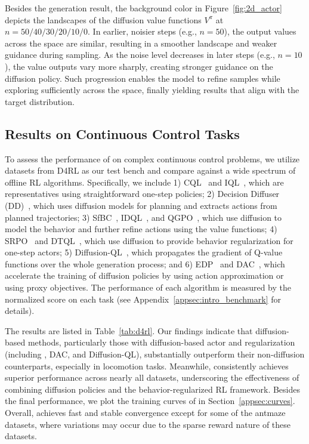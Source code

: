 Besides the generation result, the background color in Figure~\ref{fig:2d_actor} depicts the landscapes of the diffusion value functions $V^\pi$ at $n=50/40/30/20/10/0$. In earlier, noisier steps (e.g., $n=50$), the output values across the space are similar, resulting in a smoother landscape and weaker guidance during sampling. As the noise level decreases in later steps (e.g., $n=10$), the value outputs vary more sharply, creating stronger guidance on the diffusion policy. Such progression enables the model to refine samples while exploring sufficiently across the space, finally yielding results that align with the target distribution.


\subsection{Results on Continuous Control Tasks}

To assess the performance of \algbb on complex continuous control problems, we utilize datasets from D4RL as our test bench and compare \algbb against a wide spectrum of offline RL algorithms. Specifically, we include 1) CQL~\citep{cql} and IQL~\citep{iql}, which are representatives using straightforward one-step policies; 2) Decision Diffuser (DD)~\citep{dd}, which uses diffusion models for planning and extracts actions from planned trajectories; 3) SfBC~\citep{sfbc}, IDQL~\citep{idql}, and QGPO~\citep{qgpo}, which use diffusion to model the behavior and further refine actions using the value functions; 4) SRPO~\citep{srpo} and DTQL~\citep{dtql}, which use diffusion to provide behavior regularization for one-step actors; 5) Diffusion-QL~\citep{dql}, which propagates the gradient of Q-value functions over the whole generation process; and 6) EDP~\citep{edp} and DAC~\citep{dac}, which accelerate the training of diffusion policies by using action approximation or using proxy objectives. The performance of each algorithm is measured by the normalized score on each task (see Appendix~\ref{appsec:intro_benchmark} for details).



The results are listed in Table~\ref{tab:d4rl}. Our findings indicate that diffusion-based methods, particularly those with diffusion-based actor and regularization (including \algbb, DAC, and Diffusion-QL), substantially outperform their non-diffusion counterparts, especially in locomotion tasks. Meanwhile, \algbb consistently achieves superior performance across nearly all datasets, underscoring the effectiveness of combining diffusion policies and the behavior-regularized RL framework. Besides the final performance, we plot the training curves of \algbb in Section~\ref{appsec:curves}. Overall, \algbb achieves fast and stable convergence except for some of the antmaze datasets, where variations may occur due to the sparse reward nature of these datasets. 

